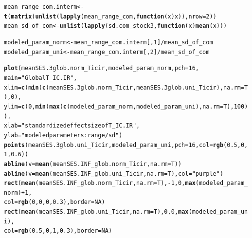 \documentclass[12pt]{article}\usepackage[]{graphicx}\usepackage[]{color}
\makeatletter
\newcommand{\hlnum}[1]{\textcolor[rgb]{0.686,0.059,0.569}{#1}}%
\newcommand{\hlstr}[1]{\textcolor[rgb]{0.192,0.494,0.8}{#1}}%
\newcommand{\hlopt}[1]{\textcolor[rgb]{0,0,0}{#1}}%
\newcommand{\hlstd}[1]{\textcolor[rgb]{0.345,0.345,0.345}{#1}}%
\newcommand{\hlkwa}[1]{\textcolor[rgb]{0.161,0.373,0.58}{\textbf{#1}}}%
\newcommand{\hlkwb}[1]{\textcolor[rgb]{0.69,0.353,0.396}{#1}}%
\newcommand{\hlkwc}[1]{\textcolor[rgb]{0.333,0.667,0.333}{#1}}%
\newcommand{\hlkwd}[1]{\textcolor[rgb]{0.737,0.353,0.396}{\textbf{#1}}}%
\newenvironment{kframe}{%
 \def\at@end@of@kframe{}%
 \ifinner\ifhmode%
  \def\at@end@of@kframe{\end{minipage}}%
  \begin{minipage}{\columnwidth}%
 \fi\fi%
 \def\FrameCommand##1{\hskip\@totalleftmargin \hskip-\fboxsep
 \colorbox{shadecolor}{##1}\hskip-\fboxsep
     \hskip-\linewidth \hskip-\@totalleftmargin \hskip\columnwidth}%
 \MakeFramed {\advance\hsize-\width
   \@totalleftmargin\z@ \linewidth\hsize
   \@setminipage}}%
 {\par\unskip\endMakeFramed%
 \at@end@of@kframe}
\newenvironment{knitrout}{}{} %
\makeatother
\begin{document}
\begin{knitrout}\small
{}\color{fgcolor}\begin{kframe}
\begin{alltt}
\hlstd{mean_range_com.interm} \hlkwb{<-} \hlkwd{t}\hlstd{(}\hlkwd{matrix}\hlstd{(}\hlkwd{unlist}\hlstd{(}\hlkwd{lapply}\hlstd{(mean_range_com,} \hlkwa{function}\hlstd{(}\hlkwc{x}\hlstd{) x)),} \hlkwc{nrow} \hlstd{=} \hlnum{2}\hlstd{))}
\hlstd{mean_sd_of_com} \hlkwb{<-} \hlkwd{unlist}\hlstd{(}\hlkwd{lapply}\hlstd{(sd.com_stock3,} \hlkwa{function}\hlstd{(}\hlkwc{x}\hlstd{)} \hlkwd{mean}\hlstd{(x)))}

\hlstd{modeled_param_norm} \hlkwb{<-} \hlstd{mean_range_com.interm[,} \hlnum{1}\hlstd{]} \hlopt{/} \hlstd{mean_sd_of_com}
\hlstd{modeled_param_uni} \hlkwb{<-} \hlstd{mean_range_com.interm[,} \hlnum{2}\hlstd{]} \hlopt{/} \hlstd{mean_sd_of_com}

\hlkwd{plot}\hlstd{(meanSES.3glob.norm_Ticir, modeled_param_norm,} \hlkwc{pch} \hlstd{=} \hlnum{16}\hlstd{,}
  \hlkwc{main} \hlstd{=} \hlstr{"Global T_IC.IR"}\hlstd{,}
  \hlkwc{xlim} \hlstd{=} \hlkwd{c}\hlstd{(}\hlkwd{min}\hlstd{(}\hlkwd{c}\hlstd{(meanSES.3glob.norm_Ticir, meanSES.3glob.uni_Ticir),} \hlkwc{na.rm} \hlstd{= T),} \hlnum{0}\hlstd{),}
  \hlkwc{ylim} \hlstd{=} \hlkwd{c}\hlstd{(}\hlnum{0}\hlstd{,} \hlkwd{min}\hlstd{(}\hlkwd{max}\hlstd{(}\hlkwd{c}\hlstd{(modeled_param_norm, modeled_param_uni),} \hlkwc{na.rm} \hlstd{= T),} \hlnum{100}\hlstd{)),}
  \hlkwc{xlab} \hlstd{=} \hlstr{"standardized effect size of T_IC.IR"}\hlstd{,}
  \hlkwc{ylab} \hlstd{=} \hlstr{"modeled parameters: range/sd"}\hlstd{)}
\hlkwd{points}\hlstd{(meanSES.3glob.uni_Ticir, modeled_param_uni,} \hlkwc{pch} \hlstd{=} \hlnum{16}\hlstd{,} \hlkwc{col} \hlstd{=} \hlkwd{rgb}\hlstd{(}\hlnum{0.5}\hlstd{,} \hlnum{0}\hlstd{,} \hlnum{1}\hlstd{,} \hlnum{0.6}\hlstd{))}
\hlkwd{abline}\hlstd{(}\hlkwc{v} \hlstd{=} \hlkwd{mean}\hlstd{(meanSES.INF_glob.norm_Ticir,} \hlkwc{na.rm} \hlstd{= T))}
\hlkwd{abline}\hlstd{(}\hlkwc{v} \hlstd{=} \hlkwd{mean}\hlstd{(meanSES.INF_glob.uni_Ticir,} \hlkwc{na.rm} \hlstd{= T),} \hlkwc{col} \hlstd{=} \hlstr{"purple"}\hlstd{)}
\hlkwd{rect}\hlstd{(}\hlkwd{mean}\hlstd{(meanSES.INF_glob.norm_Ticir,} \hlkwc{na.rm} \hlstd{= T),} \hlopt{-}\hlnum{1}\hlstd{,} \hlnum{0}\hlstd{,} \hlkwd{max}\hlstd{(modeled_param_norm)} \hlopt{+} \hlnum{1}\hlstd{,}
  \hlkwc{col} \hlstd{=} \hlkwd{rgb}\hlstd{(}\hlnum{0}\hlstd{,} \hlnum{0}\hlstd{,} \hlnum{0}\hlstd{,} \hlnum{0.3}\hlstd{),} \hlkwc{border} \hlstd{=} \hlnum{NA}\hlstd{)}
\hlkwd{rect}\hlstd{(}\hlkwd{mean}\hlstd{(meanSES.INF_glob.uni_Ticir,} \hlkwc{na.rm} \hlstd{= T),} \hlnum{0}\hlstd{,} \hlnum{0}\hlstd{,} \hlkwd{max}\hlstd{(modeled_param_uni),}
  \hlkwc{col} \hlstd{=} \hlkwd{rgb}\hlstd{(}\hlnum{0.5}\hlstd{,} \hlnum{0}\hlstd{,} \hlnum{1}\hlstd{,} \hlnum{0.3}\hlstd{),} \hlkwc{border} \hlstd{=} \hlnum{NA}\hlstd{)}
\end{alltt}
\end{kframe}\begin{figure}


\end{figure}
\end{knitrout}
\end{document}
